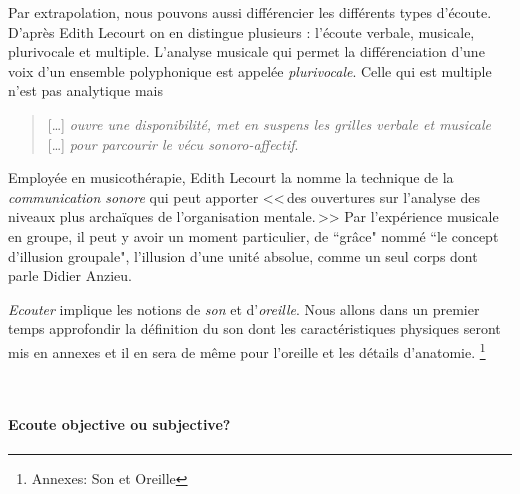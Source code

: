 Par extrapolation, nous pouvons aussi différencier les différents types d'écoute. D'après Edith Lecourt \autocite[ch. 10 <<\,De l'écoute verbale à l'écoute musicale\,>>, p. 182.]{lecourt:decouvrir}
 on en distingue plusieurs : l'écoute verbale, musicale, plurivocale et multiple.
 L'analyse musicale qui permet la différenciation d'une voix d'un ensemble polyphonique est appelée \emph{plurivocale}. Celle qui est multiple n'est pas analytique  mais 
 \begin{quote}
 	 [\ldots] \textit{ouvre une disponibilité, met en suspens les grilles verbale et musicale} [\ldots] \emph{pour parcourir le vécu sonoro-affectif}\autocite[p. 183]{lecourt:decouvrir}.
 \end{quote}
 Employée en musicothérapie, Edith Lecourt la nomme la technique de la  \emph{communication sonore} qui peut apporter 
 <<\,des ouvertures sur l'analyse des niveaux plus archaïques de l'organisation mentale.\,>>\autocite[p. 154]{lecourt:decouvrir}	
 Par l'expérience musicale en groupe, il peut y avoir un moment particulier, de ``grâce"  nommé ``le concept d'illusion groupale", l'illusion d'une unité absolue, comme un seul corps\autocite{anzieu:groupal} dont parle Didier Anzieu.


 
\emph{Ecouter} implique les notions de \emph{son} et
d'\emph{oreille}. Nous allons dans un premier temps approfondir  la
définition du son dont les caractéristiques physiques seront mis en
annexes et il en sera de même pour l'oreille et les détails
d'anatomie. \footnote{Annexes: Son et Oreille}

\







\paragraph{Ecoute objective ou subjective?}

